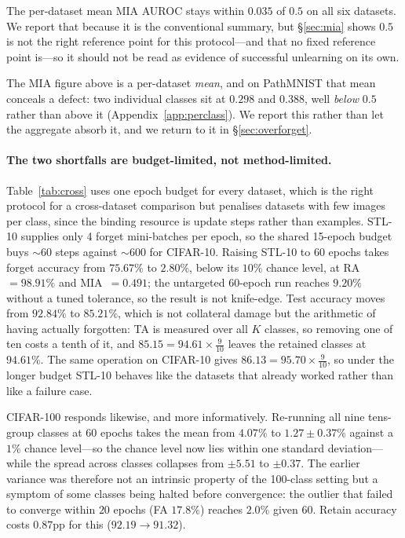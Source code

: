 \documentclass{article}
\theoremstyle{remark}
\theoremstyle{plain}
\begin{document}
The per-dataset mean MIA AUROC stays within $0.035$ of $0.5$ on all six
datasets. We report that because it is the conventional summary, but
\S\ref{sec:mia} shows $0.5$ is not the right reference point for this
protocol---and that no fixed reference point is---so it should not be read as
evidence of successful unlearning on its own.

The MIA figure above is a per-dataset \emph{mean}, and on PathMNIST that mean
conceals a defect: two individual classes sit at $0.298$ and $0.388$, well
\emph{below} $0.5$ rather than above it (Appendix~\ref{app:perclass}). We
report this rather than let the aggregate absorb it, and we return to it in
\S\ref{sec:overforget}.

\paragraph{The two shortfalls are budget-limited, not method-limited.}
\label{sec:crossdataset_stl}
Table~\ref{tab:cross} uses one epoch budget for every dataset, which is the
right protocol for a cross-dataset comparison but penalises datasets with few
images per class, since the binding resource is update steps rather than
examples. STL-10 supplies only 4 forget mini-batches per epoch, so the shared
15-epoch budget buys ${\sim}60$ steps against ${\sim}600$ for CIFAR-10. Raising
STL-10 to 60 epochs takes forget accuracy from $75.67\%$ to $\mathbf{2.80\%}$,
below its $10\%$ chance level, at RA~$=98.91\%$ and MIA~$=0.491$; the
untargeted 60-epoch run reaches $9.20\%$ without a tuned tolerance, so the
result is not knife-edge. Test accuracy moves from $92.84\%$ to $85.21\%$, which
is not collateral damage but the arithmetic of having actually forgotten: TA is
measured over all $K$ classes, so removing one of ten costs a tenth of it, and
$85.15 = 94.61 \times \tfrac{9}{10}$ leaves the retained classes at $94.61\%$.
The same operation on CIFAR-10 gives $86.13 = 95.70 \times \tfrac{9}{10}$, so
under the longer budget STL-10 behaves like the datasets that already worked
rather than like a failure case.

CIFAR-100 responds likewise, and more informatively. Re-running all nine
tens-group classes at 60 epochs takes the mean from $4.07\%$ to
$\mathbf{1.27 \pm 0.37\%}$ against a $1\%$ chance level---so the chance level now
lies within one standard deviation---while the spread across classes collapses
from $\pm 5.51$ to $\pm 0.37$. The earlier variance was therefore not an
intrinsic property of the 100-class setting but a symptom of some classes being
halted before convergence: the outlier that failed to converge within $20$
epochs (FA $17.8\%$) reaches $2.0\%$ given $60$. Retain accuracy costs $0.87$pp
for this ($92.19 \to 91.32$).
\end{document}
